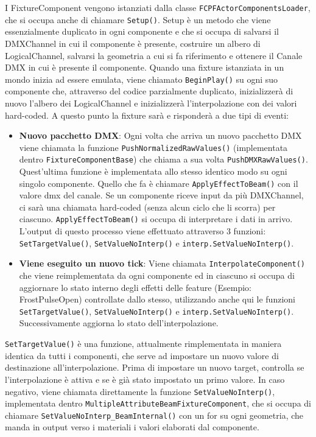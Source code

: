 \documentclass[main.tex]{subfiles}
\begin{document}
I FixtureComponent vengono istanziati dalla classe \lstinline{FCPFActorComponentsLoader}, che si occupa anche di chiamare \lstinline{Setup()}. Setup è un metodo che viene essenzialmente duplicato in ogni componente e che si occupa di salvarsi il DMXChannel in cui il componente è presente, costruire un albero di LogicalChannel, salvarsi la geometria a cui si fa riferimento e ottenere il Canale DMX in cui è presente il componente. Quando una fixture istanziata in un mondo inizia ad essere emulata, viene chiamato \lstinline{BeginPlay()} su ogni suo componente che, attraverso del codice parzialmente duplicato, inizializzerà di nuovo l'albero dei LogicalChannel e inizializzerà l'interpolazione con dei valori hard-coded. A questo punto la fixture sarà  e risponderà a due tipi di eventi:
\begin{itemize}
    \item \textbf{Nuovo pacchetto DMX}: Ogni volta che arriva un nuovo pacchetto DMX viene chiamata la funzione \lstinline{PushNormalizedRawValues()} (implementata dentro \lstinline{FixtureComponentBase}) che chiama a sua volta \lstinline{PushDMXRawValues()}. Quest'ultima funzione è implementata allo stesso identico modo su ogni singolo componente. Quello che fa è chiamare \lstinline{ApplyEffectToBeam()} con il valore dmx del canale. Se un componente riceve input da più DMXChannel, ci sarà una chiamata hard-coded (senza alcun ciclo che li scorra) per ciascuno. \lstinline{ApplyEffectToBeam()} si occupa di interpretare i dati in arrivo. L'output di questo processo viene effettuato attraverso 3 funzioni: \lstinline{SetTargetValue()}, \lstinline{SetValueNoInterp()} e \lstinline{interp.SetValueNoInterp()}.
    \item \textbf{Viene eseguito un nuovo tick}: Viene chiamata \lstinline{InterpolateComponent()} che viene reimplementata da ogni componente ed in ciascuno si occupa di aggiornare lo stato interno degli effetti delle feature (Esempio: FrostPulseOpen) controllate dallo stesso, utilizzando anche qui le funzioni \lstinline{SetTargetValue()}, \lstinline{SetValueNoInterp()} e \lstinline{interp.SetValueNoInterp()}. Successivamente aggiorna lo stato dell'interpolazione.
\end{itemize}
\lstinline{SetTargetValue()} è una funzione, attualmente rimplementata in maniera identica da tutti i componenti, che serve ad impostare un nuovo valore di destinazione all'interpolazione. Prima di impostare un nuovo target, controlla se l'interpolazione è attiva e se è già stato impostato un primo valore. In caso negativo, viene chiamata direttamente la funzione \lstinline{SetValueNoInterp()}, implementata dentro \lstinline{MultipleAttributeBeamFixtureComponent}, che si occupa di chiamare \lstinline{SetValueNoInterp_BeamInternal()} con un for su ogni geometria, che manda in output verso i materiali i valori elaborati dal componente.
\end{document}
